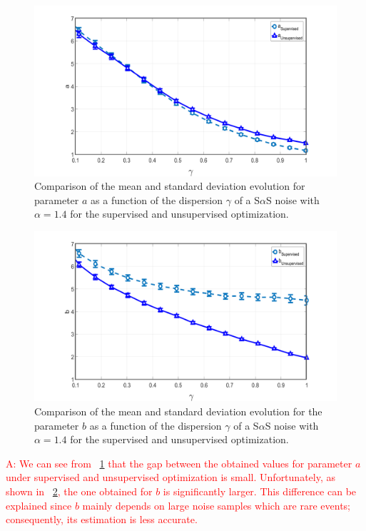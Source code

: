 \documentclass[a4paper]{IEEEtran}
\begin{document}
\begin{figure}
  \centering
  \includegraphics[width=\linewidth]{fig-7}
  \caption{Comparison of the mean and standard deviation
    evolution for parameter $a$ as a function of the
    dispersion $\gamma$ of a S$\alpha$S noise with
    $\alpha=1.4$ for the supervised and unsupervised
    optimization.}
  \label{fig:7}
\end{figure}

\begin{figure}
  \centering \includegraphics[width=\linewidth]{fig-8}
  \caption{Comparison of the mean and standard deviation
    evolution for the parameter $b$ as a function of the
    dispersion $\gamma$ of a S$\alpha$S noise with
    $\alpha=1.4$ for the supervised and unsupervised
    optimization.}
  \label{fig:8}
\end{figure}

\textcolor{red}{A: We can see from \figurename~\ref{fig:7}
  that the gap between the obtained values for parameter $a$
  under supervised and unsupervised optimization is small.
  Unfortunately, as shown in \figurename~\ref{fig:8}, the
  one obtained for $b$ is significantly larger. This
  difference can be explained since $b$ mainly depends on
  large noise samples which are rare events; consequently,
  its estimation is less accurate. }
\end{document}
